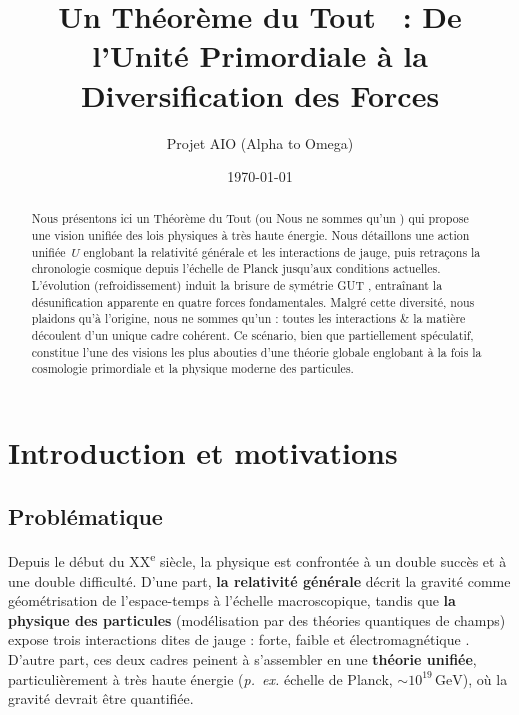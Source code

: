 \documentclass[12pt]{article}
\title{\textbf{Un \og Th\'eor\`eme du Tout \fg{}~: De l'Unit\'e Primordiale \`a la Diversification des Forces}}
\author{Projet AIO (Alpha to Omega)}
\date{\today}
\begin{document}
\maketitle

\begin{abstract}
Nous pr\'esentons ici un \og Th\'eor\`eme du Tout \fg{} (ou \og Nous ne sommes qu'un \fg) 
qui propose une vision unifi\'ee des lois physiques \`a tr\`es haute \'energie. 
Nous d\'etaillons une action unifi\'ee \(\,U\) englobant la relativit\'e g\'en\'erale 
et les interactions de jauge, puis retra\c{c}ons la chronologie cosmique 
depuis l'\'echelle de Planck jusqu'aux conditions actuelles. 
L'\'evolution (refroidissement) induit la brisure de sym\'etrie \og GUT \fg{}, 
entraînant la \og d\'esunification \fg{} apparente en quatre forces fondamentales. 
Malgr\'e cette diversit\'e, nous plaidons qu'\`a l'origine, \og nous ne sommes qu'un \fg : 
toutes les interactions \& la mati\`ere d\'ecoulent d'un unique cadre coh\'erent. 
Ce sc\'enario, bien que partiellement sp\'eculatif, constitue l'une des visions les plus 
abouties d'une th\'eorie globale englobant \`a la fois la cosmologie primordiale 
et la physique moderne des particules.
\end{abstract}

\tableofcontents

\section{Introduction et motivations}
\label{sec:intro}

\subsection{Probl\'ematique}

Depuis le d\'ebut du XX\textsuperscript{e} si\`ecle, la physique est confront\'ee \`a un double succ\`es 
et \`a une double difficult\'e. D'une part, \textbf{la relativit\'e g\'en\'erale} \cite{einstein1915} 
d\'ecrit la gravit\'e comme g\'eom\'etrisation de l'espace-temps \`a l'\'echelle macroscopique, 
tandis que \textbf{la physique des particules} (mod\'elisation par des th\'eories quantiques de champs) 
expose trois interactions dites \og de jauge \fg : forte, faible et \'electromagn\'etique \cite{weinberg1995quantum, zee2010qft}.  
D'autre part, ces deux cadres peinent \`a s'assembler en une \textbf{th\'eorie unifi\'ee}, 
particuli\`erement \`a tr\`es haute \'energie (\textit{p.~ex.} \'echelle de Planck, 
\(\sim 10^{19}\,\mathrm{GeV}\)), o\`u la gravit\'e devrait \^etre quantifi\'ee.
\end{document}
